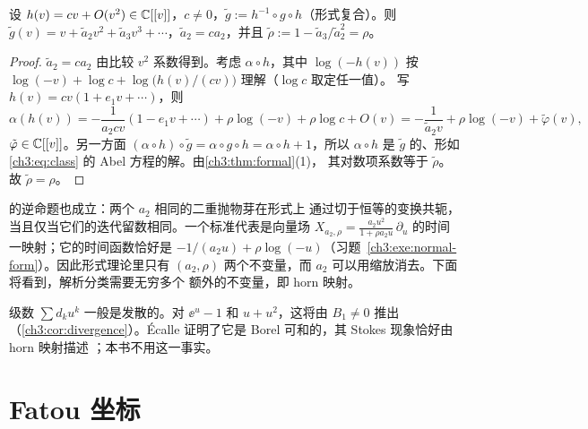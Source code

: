 \begin{proposition}[迭代留数是形式不变量]\label{ch3:prop:rho-invariant}
设 $h(v)=cv+O(v^2)\in\mathbb{C}[[v]]$，$c\ne0$，$\tilde g:=h^{-1}\circ g\circ h$（形式复合）。则
$\tilde g(v)=v+\tilde a_2v^2+\tilde a_3v^3+\cdots$，$\tilde a_2=ca_2$，并且
$\tilde\rho:=1-\tilde a_3/\tilde a_2^2=\rho$。
\end{proposition}

\begin{proof}
$\tilde a_2=ca_2$ 由比较 $v^2$ 系数得到。考虑 $\alpha\circ h$，其中
$\log(-h(v))$ 按 $\log(-v)+\log c+\log\bigl(h(v)/(cv)\bigr)$ 理解（$\log c$ 取定任一值）。
写 $h(v)=cv(1+e_1v+\cdots)$，则
\[
 \alpha(h(v))=-\frac{1}{a_2cv}(1-e_1v+\cdots)+\rho\log(-v)+\rho\log c+O(v)
 =-\frac{1}{\tilde a_2v}+\rho\log(-v)+\tilde\varphi(v),
\]
$\tilde\varphi\in\mathbb{C}[[v]]$。另一方面
$(\alpha\circ h)\circ\tilde g=\alpha\circ g\circ h=\alpha\circ h+1$，所以 $\alpha\circ h$ 是
$\tilde g$ 的、形如 \eqref{ch3:eq:class} 的 Abel 方程的解。由\cref{ch3:thm:formal}(1)，
其对数项系数等于 $\tilde\rho$。故 $\tilde\rho=\rho$。
\end{proof}

\begin{remark}[形式分类]\label{ch3:rem:formal-class}
 的逆命题也成立：两个 $a_2$ 相同的二重抛物芽在形式上
通过切于恒等的变换共轭，当且仅当它们的迭代留数相同。一个标准代表是向量场
$X_{a_2,\rho}=\frac{a_2u^2}{1+\rho a_2u}\,\partial_u$ 的时间一映射；它的时间函数恰好是
$-1/(a_2u)+\rho\log(-u)$（习题~\ref{ch3:exe:normal-form}）。因此形式理论里只有
$(a_2,\rho)$ 两个不变量，而 $a_2$ 可以用缩放消去。下面将看到，解析分类需要无穷多个
额外的不变量，即 horn 映射。
\end{remark}

\begin{remark}[发散性]\label{ch3:rem:divergence}
级数 $\sum d_ku^k$ 一般是发散的。对 $\ee^u-1$ 和 $u+u^2$，这将由 $B_1\ne0$ 推出
（\cref{ch3:cor:divergence}）。Écalle 证明了它是 Borel 可和的，其 Stokes 现象恰好由
horn 映射描述 \cite{Ecalle1981,DudkoSauzin2014}；本书不用这一事实。
\end{remark}

\section{Fatou 坐标}\label{ch3:sec:fatou}

